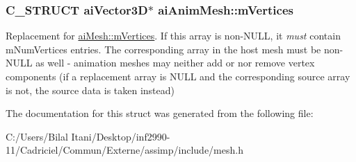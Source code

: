 \subsubsection[{\texorpdfstring{m\+Vertices}{mVertices}}]{\setlength{\rightskip}{0pt plus 5cm}C\+\_\+\+S\+T\+R\+U\+CT {\bf ai\+Vector3D}$\ast$ ai\+Anim\+Mesh\+::m\+Vertices}\hypertarget{structai_anim_mesh_a0ac2dd4c1afd23e6a9293b1d0ded3060}{}\label{structai_anim_mesh_a0ac2dd4c1afd23e6a9293b1d0ded3060}
Replacement for \hyperlink{structai_mesh_afd4588abb3e1c72821ae0234a3850662}{ai\+Mesh\+::m\+Vertices}. If this array is non-\/\+N\+U\+LL, it {\itshape must} contain m\+Num\+Vertices entries. The corresponding array in the host mesh must be non-\/\+N\+U\+LL as well -\/ animation meshes may neither add or nor remove vertex components (if a replacement array is N\+U\+LL and the corresponding source array is not, the source data is taken instead) 

The documentation for this struct was generated from the following file\+:\begin{DoxyCompactItemize}
\item 
C\+:/\+Users/\+Bilal Itani/\+Desktop/inf2990-\/11/\+Cadriciel/\+Commun/\+Externe/assimp/include/mesh.\+h\end{DoxyCompactItemize}
